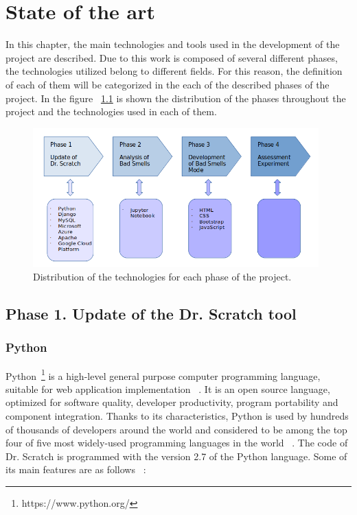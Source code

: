 

\chapter{State of the art}
\label{chap:state}

In this chapter, the main technologies and tools used in the development of the project are described. Due to this work is composed of several different phases, the technologies utilized belong to different fields. For this reason, the definition of each of them will be categorized in the each of the described phases of the project. In the figure ~\ref{fig:phasesdistribution} is shown the distribution of the phases throughout the project and the technologies used in each of them. 

 \begin{figure}
    \centering
    \includegraphics[width=11cm,                         keepaspectratio]{img/phases_state_art.png}
    \caption{Distribution of the technologies for each phase of the project.}
    \label{fig:phasesdistribution}
\end{figure}

\section{Phase 1. Update of the Dr. Scratch tool}
\label{sec:phase_1}

\subsection{Python} 
\label{subsec:python}

Python~\footnote{https://www.python.org/} is a high-level general purpose computer programming language, suitable for web application implementation ~\cite{kuhlman:python}. It is an open source language, optimized for software quality, developer productivity, program portability and component integration. Thanks to its characteristics, Python is used by hundreds of thousands of developers around the world and considered to be among the top four of five most widely-used programming languages in the world ~\cite{lutz:programming}. The code of Dr. Scratch is programmed with the version 2.7 of the Python language. Some of its main features are as follows ~\cite{javatpoint:_python}:


